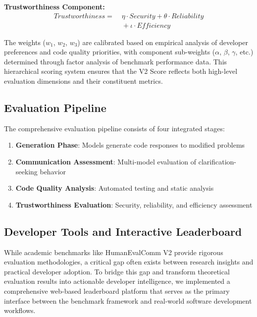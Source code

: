 \documentclass[conference]{IEEEtran}
\begin{document}
\textbf{Trustworthiness Component:}
\begin{align}
    \mathit{Trustworthiness} =
    &\; \eta \cdot \mathit{Security}
    + \theta \cdot \mathit{Reliability} \\
    &\; + \iota \cdot \mathit{Efficiency}
\end{align}

The weights ($w_1$, $w_2$, $w_3$) are calibrated based on empirical analysis of developer preferences and code quality priorities, with component sub-weights ($\alpha$, $\beta$, $\gamma$, etc.) determined through factor analysis of benchmark performance data. This hierarchical scoring system ensures that the V2 Score reflects both high-level evaluation dimensions and their constituent metrics.

\subsection{Evaluation Pipeline}

The comprehensive evaluation pipeline consists of four integrated stages:

\begin{enumerate}
    \item \textbf{Generation Phase}: Models generate code responses to modified problems
    \item \textbf{Communication Assessment}: Multi-model evaluation of clarification-seeking behavior
    \item \textbf{Code Quality Analysis}: Automated testing and static analysis
    \item \textbf{Trustworthiness Evaluation}: Security, reliability, and efficiency assessment
\end{enumerate}

\subsection{Developer Tools and Interactive Leaderboard}

While academic benchmarks like HumanEvalComm V2 provide rigorous evaluation methodologies, a critical gap often exists between research insights and practical developer adoption. To bridge this gap and transform theoretical evaluation results into actionable developer intelligence, we implemented a comprehensive web-based leaderboard platform that serves as the primary interface between the benchmark framework and real-world software development workflows.
\end{document}
